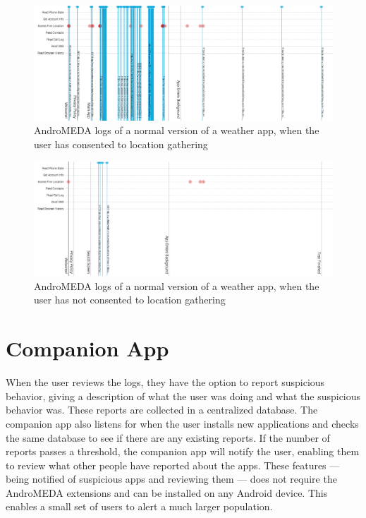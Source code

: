 \begin{figure}[h]
\begin{center}
\includegraphics[width=1.0\columnwidth]{figs/AndroMEDA_Weather_Notmalware_Location}
\caption{AndroMEDA logs of a normal version of a weather app, when the user has consented to location gathering }
\label{fig:spyware_logs_nonmalware_location}
\end{center}
\end{figure}


\begin{figure}[h]
\begin{center}
\includegraphics[width=1.0\columnwidth]{figs/AndroMEDA_Weather_Notmalware_Nolocation}
\caption{AndroMEDA logs of a normal version of a weather app, when the user has not consented to location gathering }
\label{fig:spyware_logs_nonmalware_noloc}
\end{center}
\end{figure}


\section{Companion App}
When the user reviews the logs, they have the option to report suspicious behavior, giving a description of what the user was doing and what the suspicious behavior was. These reports are collected in a centralized database. The companion app also listens for when the user installs new applications and checks the same database to see if there are any existing reports. If the number of reports passes a threshold, the companion app will notify the user, enabling them to review what other people have reported about the apps. These features --- being notified of suspicious apps and reviewing them --- does not require the AndroMEDA extensions and can be installed on any Android device. This enables a small set of users to alert a much larger population.

